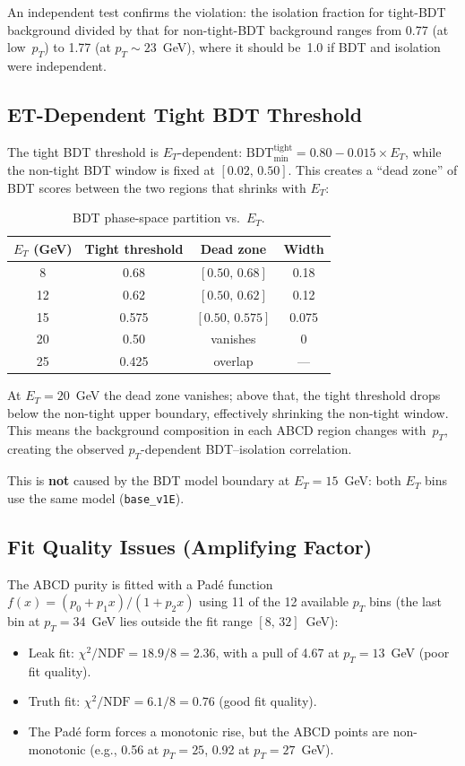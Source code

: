 \documentclass[11pt,a4paper]{article}
\begin{document}
An independent test confirms the violation: the isolation fraction for
tight-BDT background divided by that for non-tight-BDT background ranges
from 0.77 (at low~$p_T$) to 1.77 (at $p_T \sim 23$~GeV), where it should
be~1.0 if BDT and isolation were independent.

\subsection{ET-Dependent Tight BDT Threshold}
\label{sec:threshold}

The tight BDT threshold is $E_T$-dependent:
$\mathrm{BDT}_{\min}^{\mathrm{tight}} = 0.80 - 0.015 \times E_T$,
while the non-tight BDT window is fixed at $[0.02,\, 0.50]$.
This creates a ``dead zone'' of BDT scores between the two regions
that shrinks with $E_T$:

\begin{table}[H]
\centering
\caption{BDT phase-space partition vs.\ $E_T$.}
\label{tab:deadzone}
\begin{tabular}{@{}cccc@{}}
\toprule
$E_T$ (GeV) & Tight threshold & Dead zone & Width \\
\midrule
 8  & 0.68 & $[0.50,\,0.68]$ & 0.18 \\
12  & 0.62 & $[0.50,\,0.62]$ & 0.12 \\
15  & 0.575 & $[0.50,\,0.575]$ & 0.075 \\
20  & 0.50 & vanishes & 0 \\
25  & 0.425 & overlap & --- \\
\bottomrule
\end{tabular}
\end{table}

At $E_T = 20$~GeV the dead zone vanishes; above that, the tight threshold
drops below the non-tight upper boundary, effectively shrinking the non-tight
window. This means the background composition in each ABCD region changes
with~$p_T$, creating the observed $p_T$-dependent BDT--isolation correlation.

This is \textbf{not} caused by the BDT model boundary at $E_T = 15$~GeV:
both $E_T$ bins use the same model (\texttt{base\_v1E}).

\subsection{Fit Quality Issues (Amplifying Factor)}
\label{sec:fitquality}

The ABCD purity is fitted with a Pad\'e function
$f(x) = (p_0 + p_1 x) / (1 + p_2 x)$ using 11 of the 12 available $p_T$
bins (the last bin at $p_T = 34$~GeV lies outside the fit range $[8,\,32]$~GeV):
\begin{itemize}
\item Leak fit: $\chi^2/\mathrm{NDF} = 18.9/8 = 2.36$, with a pull of 4.67
      at $p_T = 13$~GeV (poor fit quality).
\item Truth fit: $\chi^2/\mathrm{NDF} = 6.1/8 = 0.76$ (good fit quality).
\item The Pad\'e form forces a monotonic rise, but the ABCD points are
      non-monotonic (e.g., 0.56 at $p_T = 25$, 0.92 at $p_T = 27$~GeV).
\end{itemize}
\end{document}
